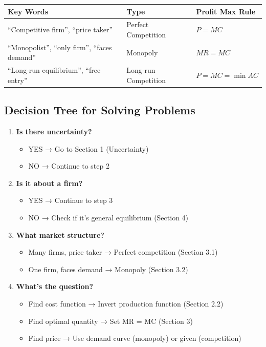 \documentclass[10pt,letterpaper]{article}
\begin{document}
\begin{table}[h]
\centering
\begin{tabular}{p{4cm}p{4cm}p{6cm}}
\toprule
\textbf{Key Words} & \textbf{Type} & \textbf{Profit Max Rule} \\
\midrule
``Competitive firm'', ``price taker'' & Perfect Competition & $P = MC$ \\
\midrule
``Monopolist'', ``only firm'', ``faces demand'' & Monopoly & $MR = MC$ \\
\midrule
``Long-run equilibrium'', ``free entry'' & Long-run Competition & $P = MC = \min AC$ \\
\bottomrule
\end{tabular}
\end{table}

\subsection{Decision Tree for Solving Problems}

\begin{enumerate}
  \item \textbf{Is there uncertainty?}
    \begin{itemize}
      \item YES → Go to Section 1 (Uncertainty)
      \item NO → Continue to step 2
    \end{itemize}

  \item \textbf{Is it about a firm?}
    \begin{itemize}
      \item YES → Continue to step 3
      \item NO → Check if it's general equilibrium (Section 4)
    \end{itemize}

  \item \textbf{What market structure?}
    \begin{itemize}
      \item Many firms, price taker → Perfect competition (Section 3.1)
      \item One firm, faces demand → Monopoly (Section 3.2)
    \end{itemize}

  \item \textbf{What's the question?}
    \begin{itemize}
      \item Find cost function → Invert production function (Section 2.2)
      \item Find optimal quantity → Set MR = MC (Section 3)
      \item Find price → Use demand curve (monopoly) or given (competition)
    \end{itemize}
\end{enumerate}
\end{document}
